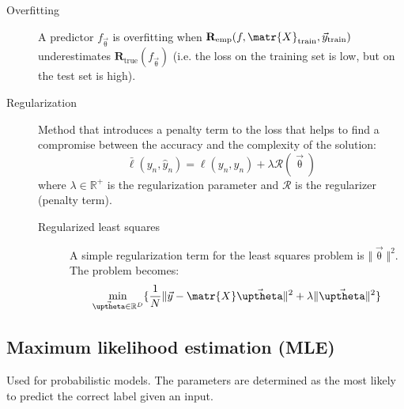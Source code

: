 \begin{description}
    \item[Overfitting] 
        \sloppy
        A predictor $f_\vec{\uptheta}$ is overfitting when $\textbf{R}_\text{emp}(f, \matr{X}_\text{train}, \vec{y}_\text{train})$
        underestimates $\textbf{R}_\text{true}(f_\vec{\uptheta})$ (i.e. the loss on the training set is low, but on the test set is high).

    \item[Regularization] 
        Method that introduces a penalty term to the loss that
        helps to find a compromise between the accuracy and the complexity of the solution:
        \[ \bar{\ell}(y_n, \hat{y}_n) = \ell(y_n, \hat{y}_n) + \lambda \mathcal{R}(\vec{\uptheta}) \]
        where $\lambda \in \mathbb{R}^+$ is the regularization parameter and $\mathcal{R}$ is the regularizer (penalty term).

        \begin{description}
            \item[Regularized least squares]  
                A simple regularization term for the least squares problem is $\Vert \vec{\uptheta} \Vert^2$.
                The problem becomes:
                \[ \min_{\vec{\uptheta} \in \mathbb{R}^D} 
                    \{ \frac{1}{N} \Vert \vec{y} - \matr{X}\vec{\uptheta} \Vert^2 + \lambda \Vert \vec{\uptheta} \Vert^2 \} \] 
        \end{description}
\end{description}


\subsection{Maximum likelihood estimation (MLE)}
Used for probabilistic models.
The parameters are determined as the most likely to predict the correct label given an input.

